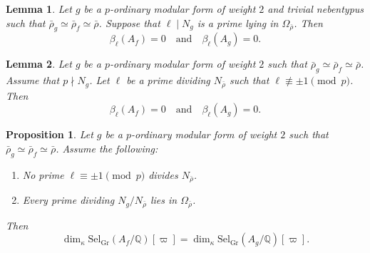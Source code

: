 \documentclass[10pt,a4paper]{amsart}
\newtheorem{lemma}{Lemma}
\newtheorem{proposition}{Proposition}
\newcommand{\Q}{\mathbb{Q}}
\begin{document}
\begin{lemma}\label{vanishing invariants for primes in Omega_f}
Let $g$ be a $p$-ordinary modular form of weight $2$ and trivial nebentypus such that $\bar{\rho}_g \simeq \bar{\rho}_f\simeq \bar{\rho}$. Suppose that $\ell \mid N_g$ is a prime lying in $\Omega_{\bar{\rho}}$. Then
\[
\beta_\ell(A_f) = 0 \quad \text{and} \quad \beta_\ell(A_g) = 0.
\]
\end{lemma}

\begin{lemma}\label{lemma for primes dividing artin cond}
Let $g$ be a $p$-ordinary modular form of weight $2$ such that $\bar{\rho}_g \simeq \bar{\rho}_f \simeq \bar{\rho}$. Assume that $p\nmid N_g$. Let $\ell$ be a prime dividing $N_{\bar{\rho}}$ such that $\ell \not\equiv \pm 1 \pmod{p}$.
Then
\[
\beta_\ell(A_f) = 0 \quad \text{and} \quad \beta_\ell(A_g) = 0.
\]
\end{lemma}

\begin{proposition}\label{main propn}
Let $g$ be a $p$-ordinary modular form of weight $2$ such that $\bar{\rho}_g \simeq \bar{\rho}_f \simeq \bar{\rho}$. Assume the following:
\begin{enumerate}
    \item No prime $\ell \equiv \pm 1 \pmod{p}$ divides $N_{\bar{\rho}}$.
    \item Every prime dividing $N_g/N_{\bar{\rho}}$ lies in $\Omega_{\bar{\rho}}$.
\end{enumerate}
Then
\[
\dim_{\kappa} \mathrm{Sel}_{\mathrm{Gr}}(A_f/\Q)[\varpi] = \dim_{\kappa} \mathrm{Sel}_{\mathrm{Gr}}(A_g/\Q)[\varpi].
\]
\end{proposition}
\end{document}
